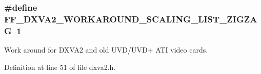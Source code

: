 \subsubsection[{\texorpdfstring{F\+F\+\_\+\+D\+X\+V\+A2\+\_\+\+W\+O\+R\+K\+A\+R\+O\+U\+N\+D\+\_\+\+S\+C\+A\+L\+I\+N\+G\+\_\+\+L\+I\+S\+T\+\_\+\+Z\+I\+G\+Z\+AG}{FF_DXVA2_WORKAROUND_SCALING_LIST_ZIGZAG}}]{\setlength{\rightskip}{0pt plus 5cm}\#define F\+F\+\_\+\+D\+X\+V\+A2\+\_\+\+W\+O\+R\+K\+A\+R\+O\+U\+N\+D\+\_\+\+S\+C\+A\+L\+I\+N\+G\+\_\+\+L\+I\+S\+T\+\_\+\+Z\+I\+G\+Z\+AG~1}\hypertarget{group__lavc__codec__hwaccel__dxva2_ga6d5f39a89d3e595eaf4198496c00599e}{}\label{group__lavc__codec__hwaccel__dxva2_ga6d5f39a89d3e595eaf4198496c00599e}


Work around for D\+X\+V\+A2 and old U\+V\+D/\+U\+V\+D+ A\+TI video cards. 



Definition at line 51 of file dxva2.\+h.

